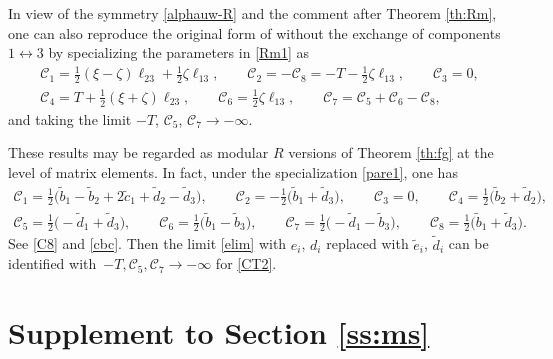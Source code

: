 \documentclass[pdftex]{sigma}
\numberwithin{equation}{section}
\begin{document}
In view of the symmetry \eqref{alphauw-R} and the comment after Theorem \ref{th:Rm},
one can also reproduce the original form of \cite[equation~(7.12)]{IKT1}
without the exchange of components $1\leftrightarrow 3$ by
specializing the parameters in \eqref{Rm1} as
\begin{gather}
{\mathcal C}_1 = \frac{1}{2}(\xi-\zeta)\ell_{23}+\frac{1}{2}\zeta\ell_{13},
\qquad
{\mathcal C}_2 = -{\mathcal C}_8 = -T - \frac{1}{2}\zeta\ell_{13}, \qquad
{\mathcal C}_3=0,\nonumber
\\
{\mathcal C}_4 = T + \frac{1}{2}(\xi+\zeta)\ell_{23},\qquad
{\mathcal C}_6 = \frac{1}{2}\zeta\ell_{13},
\qquad
{\mathcal C}_7 = {\mathcal C}_5+{\mathcal C}_6-{\mathcal C}_8,\label{CT2}
\end{gather}
and taking the limit $-T$, $\mathcal{C}_5$,
$\mathcal{C}_7 \rightarrow -\infty$.

These results may be regarded as modular $R$ versions of Theorem
\ref{th:fg} at the level of matrix elements. In fact, under the
specialization \eqref{pare1}, one has
\begin{gather*}
{\mathcal C}_1 =\frac{1}{2}\bigl(\tilde{b}_1-\tilde{b}_2 + 2\tilde{c}_1+\tilde{d}_2-\tilde{d}_3\bigr),
\qquad
{\mathcal C}_2 = -\frac{1}{2}\bigl(\tilde{b}_1+\tilde{d}_3\bigr),
\qquad
{\mathcal C}_3 =0,
\qquad
{\mathcal C}_4 = \frac{1}{2}\bigl(\tilde{b}_2+\tilde{d}_2\bigr),
\\
{\mathcal C}_5 = \frac{1}{2}\bigl(-\tilde{d}_1+\tilde{d}_3\bigr),
\qquad
 {\mathcal C}_6 = \frac{1}{2}\bigl(\tilde{b}_1-\tilde{b}_3\bigr),
\qquad
{\mathcal C}_7 = \frac{1}{2}\bigl(-\tilde{d}_1-\tilde{b}_3\bigr),
\qquad
{\mathcal C}_8 = \frac{1}{2}\bigl(\tilde{b}_1+\tilde{d}_3\bigr).
\end{gather*}
See \eqref{C8} and \eqref{cbc}. Then the limit \eqref{elim} with
$e_i$, $d_i$ replaced with $\tilde{e}_i$, $\tilde{d}_i$ can be
identified with~$-T, \mathcal{C}_5,
\mathcal{C}_7 \rightarrow -\infty$ for \eqref{CT2}.


\appendix

\section[Supplement to Section 3.4]{Supplement to Section \ref{ss:ms}}\label{ap:sup}
\end{document}

